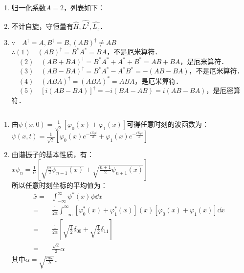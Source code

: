 
\begin{issues}
\issueDraft
\issueTODO
\end{issues}


\subsection{ }
\begin{enumerate}
\item 归一化系数$A=2$，列表如下：\\

\item 不计自旋，守恒量有$\hat H,\hat {L^2},\hat {L_z} $．
\item $\because \quad A^{\dagger} = A,B^{\dagger} = B,(AB)^{\dagger} \neq AB $ \\
$\therefore (1)\quad (AB)^{\dagger} = B^*A^* = BA $，不是厄米算符． \\
$\quad (2)\quad (AB+BA)^{\dagger} = B^*A^*+A^*+B^* = AB+BA $，是厄米算符． \\
$\quad (3)\quad (AB-BA)^{\dagger} = B^*A^*-A^*B^* = -(AB-BA) $，不是厄米算符． \\
$\quad (4)\quad (ABA)^{\dagger} = (ABA)^* = ABA $，是厄米算符． \\
$\quad (5)\quad [i(AB-BA)]^{\dagger} = -i(BA-AB) = i(AB-BA) $，是厄密算符．
\end{enumerate}
\subsection{ }
\begin{enumerate}
\item 由$\displaystyle \psi (x,0) = \frac{1}{\sqrt{2}}[\varphi_{0}(x) + \varphi_{1}(x)] $可得任意时刻的波函数为：\\
$\displaystyle \psi(x,t) = \frac{1}{\sqrt{2}}\left[\varphi_{0}(x)e^{-\frac{iE_{0}t}{\hbar}} + \varphi_{1}(x)e^{-\frac{iE_{1}t}{\hbar}} \right] $
\item 由谐振子的基本性质，有：\\
$\displaystyle x\psi_{n} = \frac{1}{\alpha} \left[\sqrt{\frac{n}{2}\psi_{n-1}(x)} + \sqrt{\frac{n+1}{2}\psi_{n+1}(x)} \right] $ \\
所以任意时刻坐标的平均值为：\\
\begin{equation}
\begin{aligned}
\bar{x} =& \int^{\infty}_{-\infty} \psi^{*}(x)\psi \dd{x} \\
=& \frac{1}{2\alpha} \int^{\infty}_{-\infty} \left[\varphi^{*}_{0}(x)+\varphi^{*}_{1}(x)\right](x)\left[\varphi_{0}(x)+\varphi_{1}(x)\right] \dd{x} \\
=& \frac{1}{2\alpha} \left[\sqrt{\frac{1}{2}}\delta_{00}+\sqrt{\frac{1}{2}}\delta_{11} \right] \\
=& \frac{\sqrt{2}}{2} \alpha
\end{aligned}
\end{equation}
其中$\displaystyle \alpha = \sqrt{\frac{m\omega}{\hbar}} $．
\end{enumerate}
